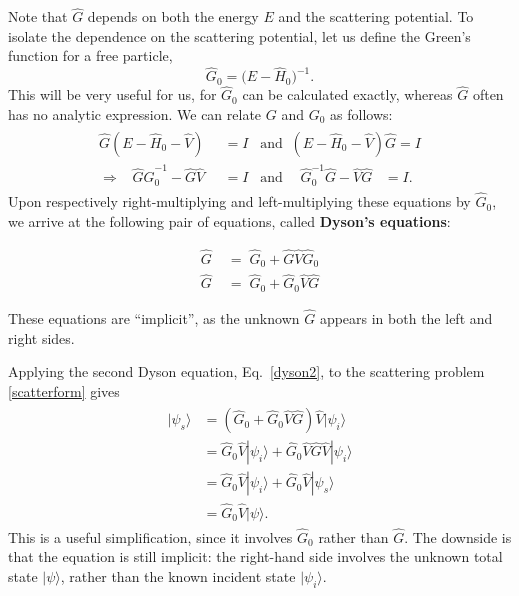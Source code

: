 \documentclass[pra,12pt]{revtex4}
\begin{document}
Note that $\hat{G}$ depends on both the energy $E$ and the scattering
potential.  To isolate the dependence on the scattering potential, let
us define the Green's function for a free particle,
\begin{equation}
  \hat{G}_0=\big(E-\hat{H}_0\big)^{-1}.
\end{equation}
This will be very useful for us, for $\hat{G}_0$ can be calculated
exactly, whereas $\hat{G}$ often has no analytic expression.  We can
relate $G$ and $G_0$ as follows:
\begin{align}
  \begin{aligned}
    \hat{G}(E-\hat{H}_0 - \hat{V})\;\; &= I \;\;\;\mathrm{and}\;\; (E-\hat{H}_0 - \hat{V})\hat{G} = I \\ \Rightarrow \;\;\; \hat{G} \hat{G}_0^{-1} - \hat{G}\hat{V} &= I \;\;\; \mathrm{and}\;\;\;\;\, \hat{G}_0^{-1} \hat{G} - \hat{V}\hat{G} \;\;\;= I.
  \end{aligned}
\end{align}
Upon respectively right-multiplying and left-multiplying these equations
by $\hat{G}_0$, we arrive at the following pair of equations, called
\textbf{Dyson's equations}:
\begin{framed}
  \begin{align}
    \hat{G} \;&= \; \hat{G}_0 + \hat{G}\hat{V}\hat{G}_0 \\
    \hat{G} \;&=\; \hat{G}_0 + \hat{G}_0\hat{V}\hat{G} \label{dyson2}
  \end{align}
\end{framed}
\noindent
These equations are ``implicit'', as the unknown $\hat{G}$ appears in
both the left and right sides.

Applying the second Dyson equation, Eq.~\eqref{dyson2}, to the
scattering problem \eqref{scatterform} gives
\begin{align}
  \begin{aligned}|\psi_s\rangle &= \left(\hat{G}_0 + \hat{G}_0\hat{V}\hat{G}\right) \hat{V} |\psi_i\rangle \\ &= \hat{G}_0 \hat{V} |\psi_i\rangle + \hat{G}_0\hat{V}\hat{G} \hat{V} |\psi_i\rangle \\ &= \hat{G}_0 \hat{V} |\psi_i\rangle + \hat{G}_0\hat{V} |\psi_s\rangle \\ &= \hat{G}_0\hat{V} |\psi\rangle.\end{aligned}
  \label{psis_implicity}
\end{align}
This is a useful simplification, since it involves $\hat{G}_0$ rather
than $\hat{G}$.  The downside is that the equation is still implicit:
the right-hand side involves the unknown total state $|\psi\rangle$,
rather than the known incident state $|\psi_i\rangle$.
\end{document}
